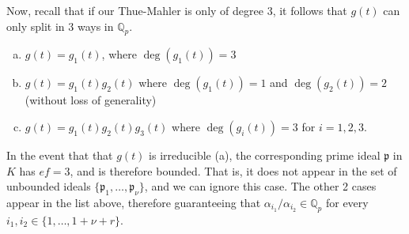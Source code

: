 Now, recall that if our Thue-Mahler is only of degree $3$, it follows that $g(t)$ can only split in 3 ways in $\mathbb{Q}_p$. 
\begin{enumerate}[(a)]
\item $g(t) = g_1(t)$, where $\deg(g_1(t)) = 3$
\item $g(t) = g_1(t)g_2(t)$ where $\deg(g_1(t)) = 1$ and $\deg(g_2(t)) = 2$ (without loss of generality) 
\item $g(t) = g_1(t)g_2(t)g_3(t)$ where $\deg(g_i(t)) = 3$ for $i = 1, 2, 3$. 
\end{enumerate}
In the event that that $g(t)$ is irreducible (a), the corresponding prime ideal $\mathfrak{p}$ in $K$ has $ef = 3$, and is therefore bounded. That is, it does not appear in the set of unbounded ideals $\{\mathfrak{p}_1, \dots, \mathfrak{p}_{\nu}\}$, and we can ignore this case. The other 2 cases appear in the list above, therefore guaranteeing that $\alpha_{i_1}/\alpha_{i_2} \in \mathbb{Q}_p$ for every $i_1, i_2 \in\{1, \dots, 1+\nu+r\}$. 


%
%

